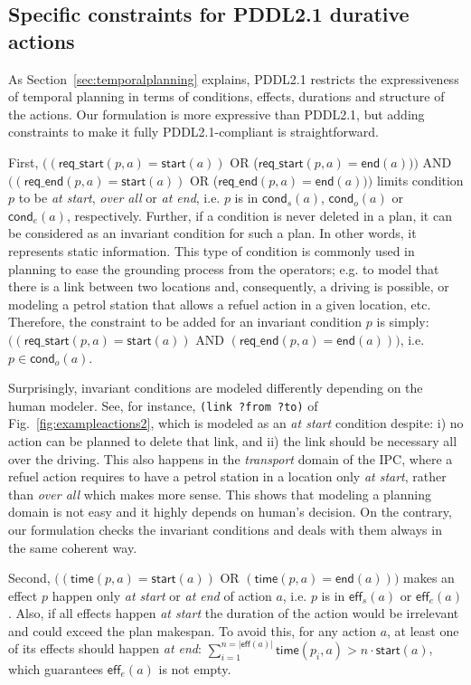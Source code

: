\documentclass[runningheads]{llncs}
\newcommand{\eff}{\mathsf{eff}}    %
\newcommand{\cond}{\mathsf{cond}}  %
\newcommand{\start}{\mathsf{start}}%
\newcommand{\en}{\mathsf{end}}     %
\newcommand{\tim}{\mathsf{time}}   %
\newcommand{\reqs}{\mathsf{req\_{start}}} %
\newcommand{\reqe}{\mathsf{req\_{end}}}   %
\begin{document}
\subsection{Specific constraints for PDDL2.1 durative actions}
\label{sec:PDDL21constraints}

As Section~\ref{sec:temporalplanning} explains, PDDL2.1 restricts the expressiveness of temporal planning in terms of conditions, effects, durations and structure of the actions. Our formulation is more expressive than PDDL2.1, but adding constraints to make it fully PDDL2.1-compliant is straightforward.


First, $((\reqs(p,a) = \start(a))$ OR ($\reqs(p,a) = \en(a)))$ AND $((\reqe(p,a) = \start(a))$ OR ($\reqe(p,a) = \en(a)))$ limits condition $p$ to be \emph{at start}, \emph{over all} or \emph{at end}, i.e. $p$ is in $\cond_s(a)$, $\cond_o(a)$ or $\cond_e(a)$, respectively.
Further, if a condition is never deleted in a plan, it can be considered as an invariant condition for such a plan. In other words, it represents static information. This type of condition is commonly used in planning to ease the grounding process from the operators; e.g. to model that there is a link between two locations and, consequently, a driving is possible, or modeling a petrol station that allows a refuel action in a given location, etc. Therefore, the constraint to be added for an invariant condition $p$ is simply: $((\reqs(p,a) = \start(a))$ AND $(\reqe(p,a) = \en(a)))$, i.e. $p \in \cond_o(a)$.

Surprisingly, invariant conditions are modeled differently depending on the human modeler. See, for instance, \texttt{(link ?from ?to)} of Fig.~\ref{fig:exampleactions2}, which is modeled as an \emph{at start} condition despite: i) no action can be planned to delete that link, and ii) the link should be necessary all over the driving.
This also happens in the \emph{transport} domain of the IPC, where a refuel action requires to have a petrol station in a location only \emph{at start}, rather than \emph{over all} which makes more sense. This shows that modeling a planning domain is not easy and it highly depends on human's decision. On the contrary, our formulation checks the invariant conditions and deals with them always in the same coherent way.


Second, $((\tim(p,a) = \start(a))$ OR $(\tim(p,a) = \en(a)))$ makes an effect $p$ happen only \emph{at start} or \emph{at end} of action $a$, i.e. $p$ is in $\eff_s(a)$ or $\eff_e(a)$.
Also, if all effects happen \emph{at start} the duration of the action would be irrelevant and could exceed the plan makespan. To avoid this, for any action $a$, at least one of its effects should happen \emph{at end}: $\sum_{i=1}^{n =|\eff(a)|} \tim(p_i,a) > n \cdot \start(a)$, which guarantees $\eff_e(a)$ is not empty.
\end{document}
